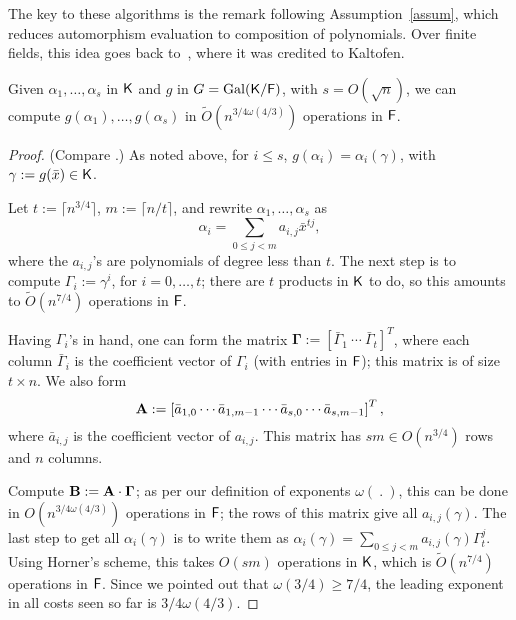 The key to these algorithms is the remark following
Assumption~\ref{assum}, which reduces automorphism evaluation to
composition of polynomials.  Over finite fields, this idea goes back
to~, where it was credited to Kaltofen.

\begin{lemma}\label{lem:modcom}
  Given $\alpha_1,\dots,\alpha_s$ in ${\mathsf{K}}$ and $g$ in $G =
  \mathrm{Gal}({\mathsf{K}}/{\mathsf{F}})$, with $s = O(\sqrt{n})$, we can compute
  $g(\alpha_1),\dots,g(\alpha_s)$ in $\tilde
  O(n^{{3}/{4}\omega({4}/{3})})$ operations in ${\mathsf{F}}$.
\end{lemma}
\begin{proof}
(Compare \cite[Lemma~3]{KalSho98}.) As noted above, for $i\le s$,
  $g(\alpha_i) = \alpha_i(\gamma)$, with $\gamma := g(\bar x) \in {\mathsf{K}}$.

  Let $t := \lceil n^{3/4} \rceil$, $m:=\lceil n/t\rceil$, and rewrite $\alpha_1 , \ldots , \alpha_s$ as 
$$\alpha_i = \sum_{0 \leq j < m} a_{i,j}\bar x^{tj},$$ where the
  $a_{i,j}$'s are polynomials of degree less than $t$. The next step
  is to compute $\Gamma_i := \gamma^i$, for $i = 0 , \ldots , t$;
  there are $t$ products in ${\mathsf{K}}$ to do, so this amounts to
  $\tilde{O}(n^{7/4})$ operations in ${\mathsf{F}}$.

  Having $\Gamma_i$'s in hand, one can form the matrix $\boldsymbol{\Gamma} :=
  \left[ \bar \Gamma_1 ~ \cdots ~\bar \Gamma_t \right]^T$, where each column 
$\bar \Gamma_i$ is
  the coefficient vector of $\Gamma_i$ (with entries in ${\mathsf{F}}$);
  this matrix is of size $t \times n$. We also form
  $$\mat A := \left[\bar{a}_{1,0} \cdots \bar{a}_{1,m-1} \cdots
    \bar{a}_{s,0} \cdots \bar{a}_{s,m-1}\right]^T,$$ where
  $\bar{a}_{i,j}$ is the coefficient vector of $a_{i,j}$. This matrix 
  has $s m \in O(n^{3/4})$ rows and $n$ columns.

  Compute $\mat B:=\mat A \cdot \boldsymbol{\Gamma}$; as per our
  definition of exponents $\omega(\ .\ )$, this can be done in
  $O(n^{3/4 \omega(4/3)})$ operations in ${\mathsf{F}}$; the rows of this matrix
  give all $a_{i,j}(\gamma)$.  The last step to get all
  $\alpha_i(\gamma)$ is to write them as $\alpha_i(\gamma) = \sum_{0
    \leq j < m} a_{i,j}(\gamma) \Gamma_t^{j}.$ Using Horner's scheme,
  this takes $O(sm)$ operations in ${\mathsf{K}}$, which is $\tilde{O}(n^{7/4})$
  operations in ${\mathsf{F}}$. Since we pointed out that $\omega(3/4) \ge 7/4$,
  the leading exponent in all costs seen so far is
  ${3}/{4}\omega({4}/{3})$.
\end{proof}


